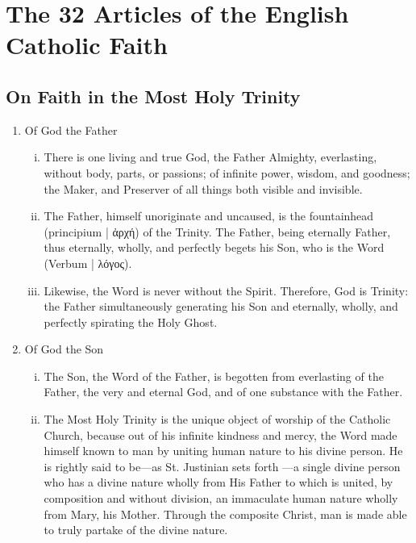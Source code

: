 \section{The 32 Articles of the English Catholic Faith}
\subsection{On Faith in the Most Holy Trinity}
\begin{enumerate}
	\item Of God the Father
	\begin{enumerate}[i.]
		\item There is one living and true God, the Father Almighty, everlasting, without body, parts, or passions; of infinite power, wisdom, and goodness; the Maker, and Preserver of all things both visible and invisible.
		\item The Father, himself unoriginate and uncaused, is the fountainhead (principium | ἀρχή) of the Trinity. The Father, being eternally Father, thus eternally, wholly, and perfectly begets his Son, who is the Word (Verbum | λόγος).
		\item Likewise, the Word is never without the Spirit. Therefore, God is Trinity: the Father simultaneously generating his Son and eternally, wholly, and perfectly spirating the Holy Ghost.
	\end{enumerate}
	\item Of God the Son
	\begin{enumerate}[i.]
		\item The Son, the Word of the Father, is begotten from everlasting of the Father, the very and eternal God, and of one substance with the Father.
		\item The Most Holy Trinity is the unique object of worship of the Catholic Church, because out of his infinite kindness and mercy, the Word made himself known to man by uniting human nature to his divine person. He is rightly said to be---as St. Justinian sets forth ---a single divine person who has a divine nature wholly from His Father to which is united, by composition and without division, an immaculate human nature wholly from Mary, his Mother. Through the composite Christ, man is made able to truly partake of the divine nature.

\end{enumerate}
\end{enumerate}
